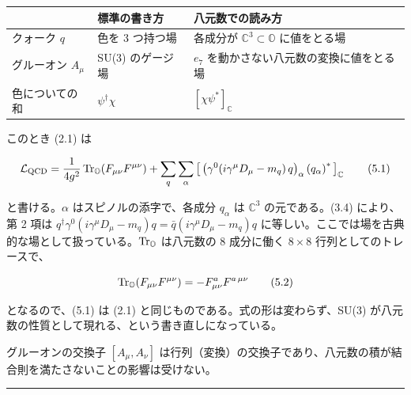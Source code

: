 \documentclass[
  a4paper,
]{ltjsarticle}
\newcounter{none} %
\begin{document}
{\def\LTcaptype{none} %
\begin{longtable}[]{@{}
  >{\raggedright\arraybackslash}p{}
  >{\raggedright\arraybackslash}p{}
  >{\raggedright\arraybackslash}p{}@{}}
\toprule\noalign{}
\begin{minipage}[b]{\linewidth}\raggedright
\end{minipage} & \begin{minipage}[b]{\linewidth}\raggedright
標準の書き方
\end{minipage} & \begin{minipage}[b]{\linewidth}\raggedright
八元数での読み方
\end{minipage} \\
\midrule\noalign{}
\endhead
\bottomrule\noalign{}
\endlastfoot
クォーク \(q\) & 色を 3 つ持つ場 & 各成分が
\(\mathbb{C}^3\subset\mathbb{O}\) に値をとる場 \\
グルーオン \(A_\mu\) & SU(3) のゲージ場 & \(e_7\)
を動かさない八元数の変換に値をとる場 \\
色についての和 & \(\psi^\dagger\chi\) & \([\chi\psi^*]_{\mathbb C}\) \\
\end{longtable}
}

このとき (2.1) は

\[
\mathcal{L}_{\rm QCD} = \frac{1}{4g^2}\,{\rm Tr}_{\mathbb O}\!\left(F_{\mu\nu}F^{\mu\nu}\right)
+ \sum_q \sum_\alpha \left[\,\left(\gamma^0 (i\gamma^\mu D_\mu - m_q)\,q\right)_\alpha \left(q_{\alpha}\right)^{*}\,\right]_{\mathbb C} \tag{5.1}
\]

と書ける。\(\alpha\) はスピノルの添字で、各成分 \(q_\alpha\) は
\(\mathbb{C}^3\) の元である。(3.4) により、第 2 項は
\(q^\dagger\gamma^0(i\gamma^\mu D_\mu - m_q)q = \bar q(i\gamma^\mu D_\mu - m_q)q\)
に等しい。ここでは場を古典的な場として扱っている。\({\rm Tr}_{\mathbb O}\)
は八元数の 8 成分に働く \(8\times8\) 行列としてのトレースで、

\[
{\rm Tr}_{\mathbb O}(F_{\mu\nu}F^{\mu\nu}) = -F^a_{\mu\nu}F^{a\,\mu\nu} \tag{5.2}
\]

となるので、(5.1) は (2.1) と同じものである。式の形は変わらず、SU(3)
が八元数の性質として現れる、という書き直しになっている。

グルーオンの交換子 \([A_\mu, A_\nu]\)
は行列（変換）の交換子であり、八元数の積が結合則を満たさないことの影響は受けない。

\begin{center}\rule{0.5\linewidth}{0.5pt}\end{center}
\end{document}
